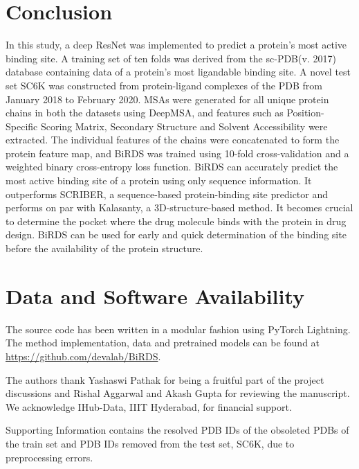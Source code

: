 \documentclass[journal=jcisd8,manuscript=article]{achemso}
\begin{document}
\section{Conclusion}
In this study, a deep ResNet was implemented to predict a protein's most active binding site. A training set of ten folds was derived from the sc-PDB(v. 2017)\cite{desaphy2015sc} database containing data of a protein's most ligandable binding site. A novel test set SC6K was constructed from protein-ligand complexes of the PDB from January 2018 to February 2020. MSAs were generated for all unique protein chains in both the datasets using DeepMSA, and features such as Position-Specific Scoring Matrix, Secondary Structure and Solvent Accessibility were extracted. The individual features of the chains were concatenated to form the protein feature map, and BiRDS was trained using 10-fold cross-validation and a weighted binary cross-entropy loss function. BiRDS can accurately predict the most active binding site of a protein using only sequence information. It outperforms SCRIBER, a sequence-based protein-binding site predictor and performs on par with Kalasanty, a 3D-structure-based method. It becomes crucial to determine the pocket where the drug molecule binds with the protein in drug design. BiRDS can be used for early and quick determination of the binding site before the availability of the protein structure.

\section{Data and Software Availability}
The source code has been written in a modular fashion using PyTorch Lightning\cite{falcon2019pytorch}. The method implementation, data and pretrained models can be found at \newline
\href{https://github.com/devalab/BiRDS}{https://github.com/devalab/BiRDS}.

\begin{acknowledgement}
    The authors thank Yashaswi Pathak for being a fruitful part of the project discussions and Rishal Aggarwal and Akash Gupta for reviewing the manuscript. We acknowledge IHub-Data, IIIT Hyderabad, for financial support.
\end{acknowledgement}

\begin{suppinfo}
    Supporting Information contains the resolved PDB IDs of the obsoleted PDBs of the train set and PDB IDs removed from the test set, SC6K, due to preprocessing errors.
\end{suppinfo}


\end{document}
